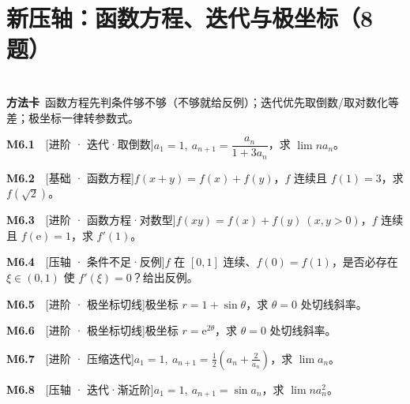 \documentclass[11pt,a4paper]{ctexart}
\newcommand{\ee}{\mathrm{e}}
\newcommand{\qi}[3]{\par\noindent\textbf{#1}\ \ {\footnotesize[#2]}\quad #3\par\smallskip}
\begin{document}
\section{新压轴：函数方程、迭代与极坐标（8 题）}
\\[0.3em]
\noindent\textbf{方法卡}\ 函数方程先判条件够不够（不够就给反例）；迭代优先取倒数/取对数化等差；极坐标一律转参数式。\\[0.5em]
\qi{M6.1}{进阶 · 迭代·取倒数}{$a_1=1,\ a_{n+1}=\dfrac{a_n}{1+3a_n}$，求 $\lim n a_n$。}
\qi{M6.2}{基础 · 函数方程}{$f(x+y)=f(x)+f(y)$，$f$ 连续且 $f(1)=3$，求 $f(\sqrt2)$。}
\qi{M6.3}{进阶 · 函数方程·对数型}{$f(xy)=f(x)+f(y)\ (x,y>0)$，$f$ 连续且 $f(\ee)=1$，求 $f\prime(1)$。}
\qi{M6.4}{压轴 · 条件不足·反例}{$f$ 在 $[0,1]$ 连续、$f(0)=f(1)$，是否必存在 $\xi\in(0,1)$ 使 $f\prime(\xi)=0$？给出反例。}
\qi{M6.5}{进阶 · 极坐标切线}{极坐标 $r=1+\sin\theta$，求 $\theta=0$ 处切线斜率。}
\qi{M6.6}{进阶 · 极坐标切线}{极坐标 $r=\ee^{2\theta}$，求 $\theta=0$ 处切线斜率。}
\qi{M6.7}{进阶 · 压缩迭代}{$a_1=1,\ a_{n+1}=\tfrac12(a_n+\tfrac2{a_n})$，求 $\lim a_n$。}
\qi{M6.8}{压轴 · 迭代·渐近阶}{$a_1=1,\ a_{n+1}=\sin a_n$，求 $\lim n a_n^{2}$。}
\end{document}
